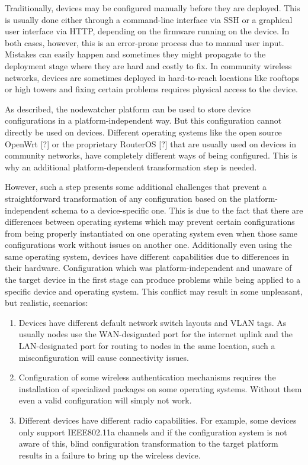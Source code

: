 \documentclass[5p,sort&compress]{elsarticle}
\begin{document}
Traditionally, devices may be configured manually before they are deployed.
This is usually done either through a command-line interface via SSH or a graphical user interface via HTTP, depending on the firmware running on the device.
In both cases, however, this is an error-prone process due to manual user input.
Mistakes can easily happen and sometimes they might propagate to the deployment stage where they are hard and costly to fix.
In community wireless networks, devices are sometimes deployed in hard-to-reach locations like rooftops or high towers and fixing certain problems requires physical access to the device.

As described, the nodewatcher platform can be used to store device configurations in a platform-independent way.
But this configuration cannot directly be used on devices.
Different operating systems like the open source OpenWrt [?] or the proprietary RouterOS [?] that are usually used on devices in community networks, have completely different ways of being configured.
This is why an additional platform-dependent transformation step is needed.

However, such a step presents some additional challenges that prevent a straightforward transformation of any configuration based on the platform-independent schema to a device-specific one.
This is due to the fact that there are differences between operating systems which may prevent certain configurations from being properly instantiated on one operating system even when those same configurations work without issues on another one.
Additionally even using the same operating system, devices have different capabilities due to differences in their hardware.
Configuration which was platform-independent and unaware of the target device in the first stage can produce problems while being applied to a specific device and operating system.
This conflict may result in some unpleasant, but realistic, scenarios:
\begin{enumerate}[label=\roman*)]
\item Devices have different default network switch layouts and VLAN tags.
As usually nodes use the WAN-designated port for the internet uplink and the LAN-designated port for routing to nodes in the same location, such a misconfiguration will cause connectivity issues.

\item Configuration of some wireless authentication mechanisms requires the installation of specialized packages on some operating systems.
Without them even a valid configuration will simply not work.

\item Different devices have different radio capabilities.
For example, some devices only support IEEE802.11a channels and if the configuration system is not aware of this, blind configuration transformation to the target platform results in a failure to bring up the wireless device.
\end{enumerate}
\end{document}
